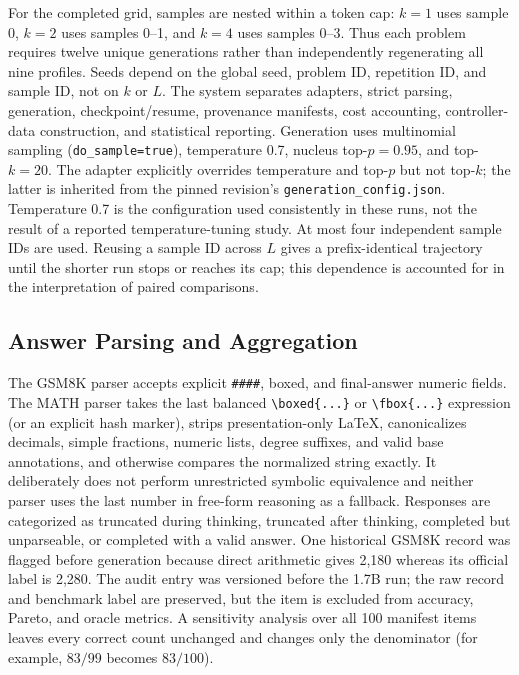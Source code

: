 \documentclass[runningheads]{llncs}
\begin{document}
For the completed grid, samples are nested within a token cap: $k=1$ uses
sample 0, $k=2$ uses samples 0--1, and $k=4$ uses samples 0--3. Thus each
problem requires twelve unique generations rather than independently
regenerating all nine profiles. Seeds depend on the global seed, problem ID,
repetition ID, and sample ID, not on $k$ or $L$. The system separates adapters,
strict parsing, generation, checkpoint/resume, provenance manifests, cost
accounting, controller-data construction, and statistical reporting.
Generation uses multinomial sampling (\texttt{do\_sample=true}), temperature
0.7, nucleus top-$p=0.95$, and top-$k=20$. The adapter explicitly overrides
temperature and top-$p$ but not top-$k$; the latter is inherited from the
pinned revision's \texttt{generation\_config.json}. Temperature 0.7 is the
configuration used consistently in these runs, not the result of a reported
temperature-tuning study. At most four independent sample IDs are used.
Reusing a sample ID across $L$ gives a prefix-identical
trajectory until the shorter run stops or reaches its cap; this dependence is
accounted for in the interpretation of paired comparisons.

\subsection{Answer Parsing and Aggregation}

The GSM8K parser accepts explicit \texttt{\#\#\#\#}, boxed, and final-answer
numeric fields. The MATH parser takes the last balanced \verb|\boxed{...}| or
\verb|\fbox{...}| expression (or an explicit hash marker), strips
presentation-only LaTeX, canonicalizes decimals, simple fractions, numeric
lists, degree suffixes, and valid base annotations, and otherwise compares the
normalized string exactly. It deliberately does not perform unrestricted
symbolic equivalence and neither parser uses the last number in free-form
reasoning as a fallback. Responses are categorized as
truncated during thinking, truncated after thinking, completed but
unparseable, or completed with a valid answer. One historical GSM8K record was
flagged before generation because direct arithmetic gives 2,180 whereas its
official label is 2,280. The audit entry was versioned before the 1.7B run; the
raw record and benchmark label are preserved, but the item is excluded from
accuracy, Pareto, and oracle metrics. A sensitivity analysis over all 100
manifest items leaves every correct count unchanged and changes only the
denominator (for example, $83/99$ becomes $83/100$).
\end{document}
